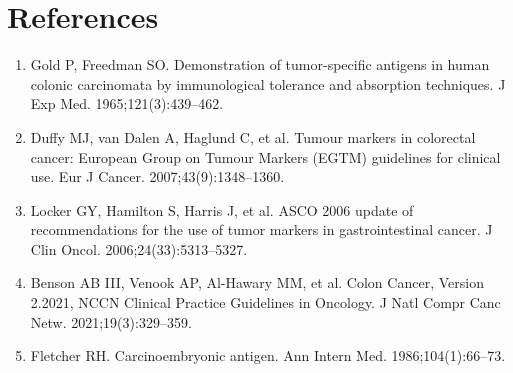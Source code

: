 \section*{References}
\begin{enumerate}
  \item Gold P, Freedman SO. Demonstration of tumor-specific antigens in human colonic carcinomata by immunological tolerance and absorption techniques. J Exp Med. 1965;121(3):439--462.
  \item Duffy MJ, van Dalen A, Haglund C, et al. Tumour markers in colorectal cancer: European Group on Tumour Markers (EGTM) guidelines for clinical use. Eur J Cancer. 2007;43(9):1348--1360.
  \item Locker GY, Hamilton S, Harris J, et al. ASCO 2006 update of recommendations for the use of tumor markers in gastrointestinal cancer. J Clin Oncol. 2006;24(33):5313--5327.
  \item Benson AB III, Venook AP, Al-Hawary MM, et al. Colon Cancer, Version 2.2021, NCCN Clinical Practice Guidelines in Oncology. J Natl Compr Canc Netw. 2021;19(3):329--359.
  \item Fletcher RH. Carcinoembryonic antigen. Ann Intern Med. 1986;104(1):66--73.
\end{enumerate}

\clearpage
